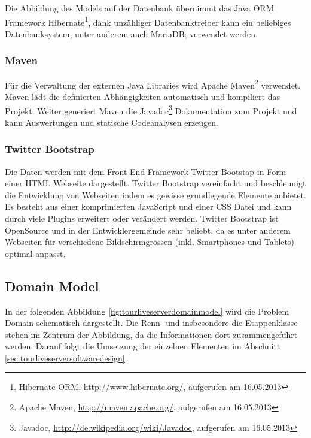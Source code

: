 Die Abbildung des Models auf der Datenbank übernimmt das Java ORM Framework Hibernate\footnote{Hibernate ORM, \url{http://www.hibernate.org/}, aufgerufen am 16.05.2013}, dank unzähliger Datenbanktreiber kann ein beliebiges Datenbanksystem, unter anderem auch MariaDB, verwendet werden.

\subsubsection{Maven}
Für die Verwaltung der externen Java Libraries wird Apache Maven\footnote{Apache Maven, \url{http://maven.apache.org/}, aufgerufen am 16.05.2013} verwendet. Maven lädt die definierten Abhängigkeiten automatisch und kompiliert das Projekt. Weiter generiert Maven die Javadoc\footnote{Javadoc, \url{http://de.wikipedia.org/wiki/Javadoc}, aufgerufen am 16.05.2013} Dokumentation zum Projekt und kann Auswertungen und statische Codeanalysen erzeugen.

\subsubsection{Twitter Bootstrap}
Die Daten werden mit dem Front-End Framework Twitter Bootstap in Form einer HTML Webseite dargestellt. Twitter Bootstrap vereinfacht und beschleunigt die Entwicklung von Webseiten indem es gewisse grundlegende Elemente anbietet. Es besteht aus einer komprimierten JavaScript und einer CSS Datei und kann durch viele Plugins erweitert oder verändert werden. Twitter Bootstrap ist OpenSource und in der Entwicklergemeinde sehr beliebt, da es unter anderem Webseiten für verschiedene Bildschirmgrössen (inkl. Smartphones und Tablets) optimal anpasst.

\subsection{Domain Model}
In der folgenden Abbildung \ref{fig:tourliveserverdomainmodel} wird die Problem Domain schematisch dargestellt. Die Renn- und insbesondere die Etappenklasse stehen im Zentrum der Abbildung, da die Informationen dort zusammengeführt werden. Darauf folgt die Umsetzung der einzelnen Elementen im Abschnitt \ref{sec:tourliveserversoftwaredesign}. 

